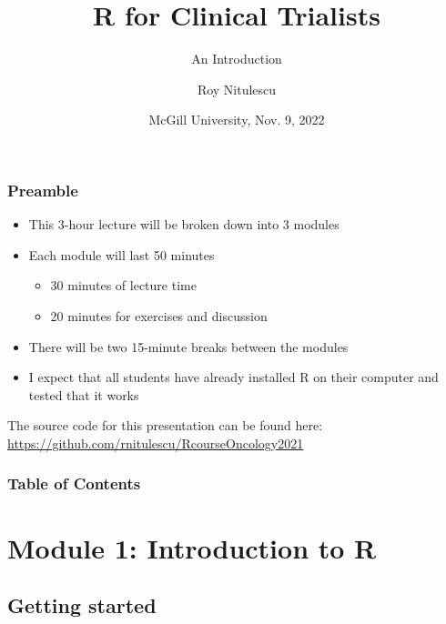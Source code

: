 \documentclass{beamer}
\title{R for Clinical Trialists}
\subtitle{An Introduction}
\author{Roy Nitulescu\inst{1}}
\institute
{
    \inst{1}%
    CITADEL\\
    CR-CHUM
}
\date[McGill, Nov. 9, 2022]{McGill University, Nov. 9, 2022}
\begin{document}

\frame{\titlepage}


\begin{frame}
    \frametitle{Preamble}
    \begin{itemize}
      \item This 3-hour lecture will be broken down into 3 modules
      \pause
      \item Each module will last 50 minutes
      \pause
      \begin{itemize}
        \item 30 minutes of lecture time
        \pause
        \item 20 minutes for exercises and discussion
        \pause
      \end{itemize}
      \item There will be two 15-minute breaks between the modules
      \pause
      \item I expect that all students have already installed R on their computer and tested that it works
    \end{itemize}
    
    \vfill
    
    \pause

    The source code for this presentation can be found here:\\
    \url{https://github.com/rnitulescu/RcourseOncology2021}
\end{frame}


\begin{frame}
    \frametitle{Table of Contents}
    \tableofcontents
\end{frame}



\section{Module 1: Introduction to R}

\subsection{Getting started}
\end{document}
